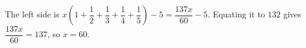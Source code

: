 The left side is $x(1+\dfrac{1}{2}+\dfrac{1}{3}+\dfrac{1}{4}+\dfrac{1}{5})-5=\dfrac{137x}{60}-5$. Equating it to $132$ gives $\dfrac{137x}{60}=137$, so $\boxed{x=60}$.
